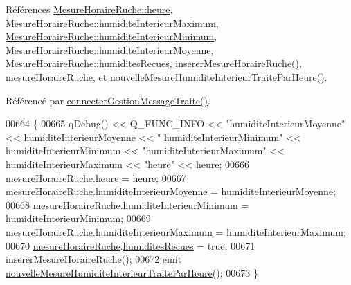 Références \hyperlink{struct_mesure_horaire_ruche_ab679cc7168deb6c3d2458c99b94e0611}{Mesure\+Horaire\+Ruche\+::heure}, \hyperlink{struct_mesure_horaire_ruche_ac8733bd08c235de27dd3eea85749c3f6}{Mesure\+Horaire\+Ruche\+::humidite\+Interieur\+Maximum}, \hyperlink{struct_mesure_horaire_ruche_adf0cbf1a3451cced1ba6fb9573654236}{Mesure\+Horaire\+Ruche\+::humidite\+Interieur\+Minimum}, \hyperlink{struct_mesure_horaire_ruche_a46f517d342e230b4e3d0b84a96b79aac}{Mesure\+Horaire\+Ruche\+::humidite\+Interieur\+Moyenne}, \hyperlink{struct_mesure_horaire_ruche_a4f825f05bf4e61db7b18a08dee759b7a}{Mesure\+Horaire\+Ruche\+::humidites\+Recues}, \hyperlink{class_ruche_a3a093c088d9c97f347394c8a681f7302}{inserer\+Mesure\+Horaire\+Ruche()}, \hyperlink{class_ruche_a9a68d3b7eb272e139f1532fdcbca2da3}{mesure\+Horaire\+Ruche}, et \hyperlink{class_ruche_a02a3e68fd11b208507867ebd0e8dbdc2}{nouvelle\+Mesure\+Humidite\+Interieur\+Traite\+Par\+Heure()}.



Référencé par \hyperlink{class_ruche_a20ec8c6dc931218e5cf682050fe845d9}{connecter\+Gestion\+Message\+Traite()}.


\begin{DoxyCode}
00664 \{
00665     qDebug() << Q\_FUNC\_INFO << \textcolor{stringliteral}{"humiditeInterieurMoyenne"} << humiditeInterieurMoyenne << \textcolor{stringliteral}{"
      humiditeInterieurMinimum"} << humiditeInterieurMinimum << \textcolor{stringliteral}{"humiditeInterieurMaximum"} << humiditeInterieurMaximum << \textcolor{stringliteral}{"heure"} <<
       heure;
00666     \hyperlink{class_ruche_a9a68d3b7eb272e139f1532fdcbca2da3}{mesureHoraireRuche}.\hyperlink{struct_mesure_horaire_ruche_ab679cc7168deb6c3d2458c99b94e0611}{heure} = heure;
00667     \hyperlink{class_ruche_a9a68d3b7eb272e139f1532fdcbca2da3}{mesureHoraireRuche}.\hyperlink{struct_mesure_horaire_ruche_a46f517d342e230b4e3d0b84a96b79aac}{humiditeInterieurMoyenne} = 
      humiditeInterieurMoyenne;
00668     \hyperlink{class_ruche_a9a68d3b7eb272e139f1532fdcbca2da3}{mesureHoraireRuche}.\hyperlink{struct_mesure_horaire_ruche_adf0cbf1a3451cced1ba6fb9573654236}{humiditeInterieurMinimum} = 
      humiditeInterieurMinimum;
00669     \hyperlink{class_ruche_a9a68d3b7eb272e139f1532fdcbca2da3}{mesureHoraireRuche}.\hyperlink{struct_mesure_horaire_ruche_ac8733bd08c235de27dd3eea85749c3f6}{humiditeInterieurMaximum} = 
      humiditeInterieurMaximum;
00670     \hyperlink{class_ruche_a9a68d3b7eb272e139f1532fdcbca2da3}{mesureHoraireRuche}.\hyperlink{struct_mesure_horaire_ruche_a4f825f05bf4e61db7b18a08dee759b7a}{humiditesRecues} = \textcolor{keyword}{true};
00671     \hyperlink{class_ruche_a3a093c088d9c97f347394c8a681f7302}{insererMesureHoraireRuche}();
00672     emit \hyperlink{class_ruche_a02a3e68fd11b208507867ebd0e8dbdc2}{nouvelleMesureHumiditeInterieurTraiteParHeure}();
00673 \}
\end{DoxyCode}
\mbox{\label{class_ruche_aa42daeffa023c83fde40072601e1fa39}} 
